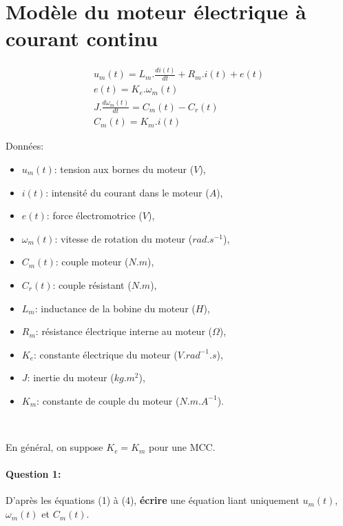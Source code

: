 



\\

\section{Modèle du moteur électrique à courant continu}

\begin{eqnarray}
u_m(t)=L_m.\frac{di(t)}{dt}+R_m.i(t)+e(t) \\
e(t)=K_e.\omega_m(t) \\
J.\frac{d\omega_m(t)}{dt}=C_m(t)-C_r(t) \\
C_m(t)=K_m.i(t)
\end{eqnarray}

Données:
\begin{itemize}
 \item $u_m(t)$: tension aux bornes du moteur ($V$),
 \item $i(t)$: intensité du courant dans le moteur ($A$),
 \item $e(t)$: force électromotrice ($V$),
 \item $\omega_m(t)$: vitesse de rotation du moteur ($rad.s^{-1}$),
 \item $C_m(t)$: couple moteur ($N.m$),
 \item $C_r(t)$: couple résistant ($N.m$),
 \item $L_m$: inductance de la bobine du moteur ($H$),
 \item $R_m$: résistance électrique interne au moteur ($\Omega$),
 \item $K_e$: constante électrique du moteur ($V.rad^{-1}.s$),
 \item $J$: inertie du moteur ($kg.m^2$),
 \item $K_m$: constante de couple du moteur ($N.m.A^{-1}$).
\end{itemize}

~\

En général, on suppose $K_e=K_m$ pour une MCC.

\paragraph{Question 1:} D'après les équations (1) à (4), \textbf{écrire} une équation liant uniquement $u_m(t)$, $\omega_m(t)$ et $C_m(t)$.

